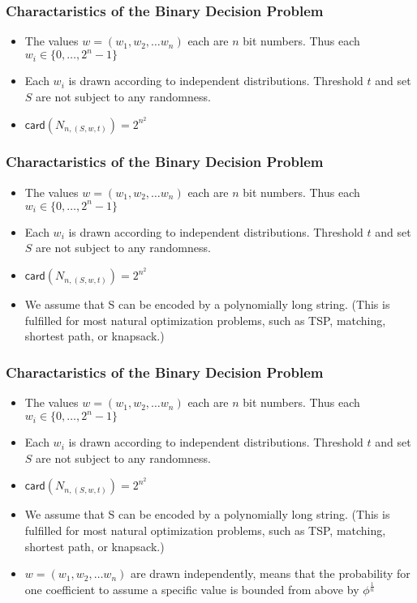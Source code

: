 \begin{frame}
    \frametitle{Charactaristics of the Binary Decision Problem}

    \begin{itemize}
        \item The values $w = (w_1, w_2, \dots w_n)$ each are $n$ bit numbers. Thus each $w_i
                  \in \{0, \dots, 2^n - 1\}$
        \item Each $w_i$ is drawn according to independent distributions. Threshold $t$ and
              set $S$ are not subject to any randomness.
        \item $\textsf{card}(N_{n, (S, w, t)}) = 2^{n^2}$
    \end{itemize}

\end{frame}

\begin{frame}
    \frametitle{Charactaristics of the Binary Decision Problem}

    \begin{itemize}
        \item The values $w = (w_1, w_2, \dots w_n)$ each are $n$ bit numbers. Thus each $w_i
                  \in \{0, \dots, 2^n - 1\}$
        \item Each $w_i$ is drawn according to independent distributions. Threshold $t$ and
              set $S$ are not subject to any randomness.
        \item $\textsf{card}(N_{n, (S, w, t)}) = 2^{n^2}$
        \item We assume that S can be encoded by a polynomially long string. (This is
              fulfilled for most natural optimization problems, such as TSP, matching,
              shortest path, or knapsack.)
    \end{itemize}

\end{frame}

\begin{frame}
    \frametitle{Charactaristics of the Binary Decision Problem}

    \begin{itemize}
        \item The values $w = (w_1, w_2, \dots w_n)$ each are $n$ bit numbers. Thus each $w_i
                  \in \{0, \dots, 2^n - 1\}$
        \item Each $w_i$ is drawn according to independent distributions. Threshold $t$ and
              set $S$ are not subject to any randomness.
        \item $\textsf{card}(N_{n, (S, w, t)}) = 2^{n^2}$
        \item We assume that S can be encoded by a polynomially long string. (This is
              fulfilled for most natural optimization problems, such as TSP, matching,
              shortest path, or knapsack.)
        \item $w = (w_1, w_2, \dots w_n)$ are drawn independently, means that the probability for one coefficient to assume a specific value is bounded from above by $\phi^{\frac{1}{n}}$
    \end{itemize}

\end{frame}

